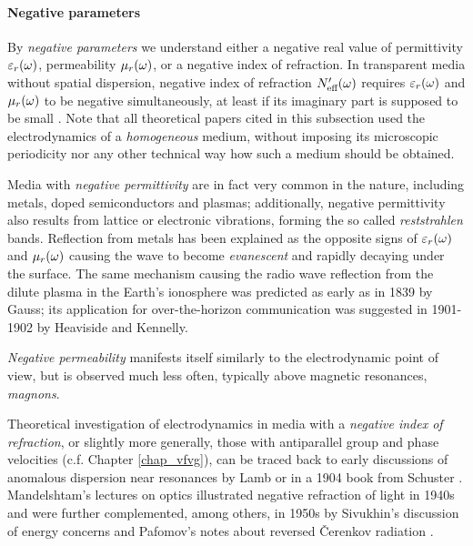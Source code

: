 \paragraph{Negative parameters}%
By \textit{negative parameters} we  understand either a negative real value of permittivity $\varepsilon_r(\omega)$, permeability $\mu_r(\omega)$, 
or a negative index of refraction. In transparent media without spatial dispersion, negative index of refraction $N_{\text{eff} }'(\omega)$ requires $\varepsilon_r(\omega)$ and $\mu_r(\omega)$ to be negative simultaneously, at least if its imaginary part is supposed to be small \cite{pazoutova2011dp}.  %
Note that all theoretical papers cited in this subsection used the electrodynamics of a \textit{homogeneous} medium, without imposing its microscopic periodicity nor any other technical way how such a medium should be obtained. 

Media with \textit{negative permittivity} are in fact very common in the nature, including metals, doped semiconductors and plasmas; additionally, negative permittivity also results from lattice or electronic vibrations, forming the so called \textit{reststrahlen} bands. Reflection from metals has been explained  %
as the opposite signs of $\varepsilon_r(\omega)$ and $\mu_r(\omega)$ causing the wave to become \textit{evanescent} and rapidly decaying under the surface. %
The same mechanism causing the radio wave reflection from the dilute plasma in the Earth's ionosphere was predicted as early as in 1839 by Gauss; its application for over-the-horizon communication was suggested in 1901-1902 by Heaviside and Kennelly.

\textit{Negative permeability} manifests itself similarly to the electrodynamic point of view, but is observed much less often, typically above magnetic resonances, \textit{magnons}.

Theoretical investigation of electrodynamics in media with a \textit{negative index of refraction}, or slightly more generally, those with antiparallel group and phase velocities (c.f. Chapter \ref{chap_vfvg}), can be traced back \cite{agranovich2006spatial} to early discussions of anomalous dispersion near resonances by Lamb or in a 1904 book from Schuster \cite{schuster1904introduction, boardman2005negative}. Mandelshtam's lectures on optics illustrated negative refraction of light in 1940s \cite{mandelstam1971lectures} and were further complemented, among others, in 1950s by Sivukhin's discussion of energy concerns \cite{sivukhin1957energy} and Pafomov's notes about reversed \v{C}erenkov radiation \cite{pafomov1956cerenkov}. 

